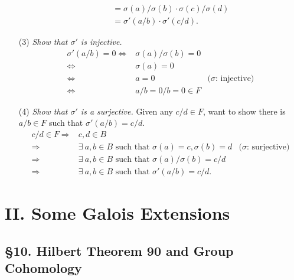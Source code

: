 \documentclass{article}
\begin{document}
\begin{enumerate}
\begin{enumerate}
\begin{align*}
  &= \sigma(a)/\sigma(b) \cdot \sigma(c)/\sigma(d) \\
  &= \sigma'(a/b) \cdot \sigma'(c/d).
  \end{align*}
  \end{enumerate}
\item[(3)]
\emph{Show that $\sigma'$ is injective.}
  \begin{align*}
  \sigma'(a/b) = 0
  \Longleftrightarrow&
  \sigma(a)/\sigma(b) = 0 \\
  \Longleftrightarrow&
  \sigma(a) = 0 \\
  \Longleftrightarrow&
   a = 0
    &\text{($\sigma$: injective)} \\
  \Longleftrightarrow&
  a/b = 0/b = 0 \in F
  \end{align*}
\item[(4)]
\emph{Show that $\sigma'$ is a surjective.}
Given any $c/d \in F$, want to show there is $a/b \in F$ such that $\sigma'(a/b) = c/d$.
  \begin{align*}
  c/d \in F
  \Longrightarrow&
  c, d \in B \\
  \Longrightarrow&
  \exists \: a, b \in B \text{ such that } \sigma(a)=c, \sigma(b)=d
    &\text{($\sigma$: surjective)} \\
  \Longrightarrow&
  \exists \: a, b \in B \text{ such that } \sigma(a) / \sigma(b) = c / d \\
  \Longrightarrow&
  \exists \: a, b \in B \text{ such that } \sigma'(a/b) = c/d.
  \end{align*}
\end{enumerate}






\newpage
\section*{II. Some Galois Extensions \\}



\subsection*{\S 10. Hilbert Theorem 90 and Group Cohomology \\}
\end{document}
